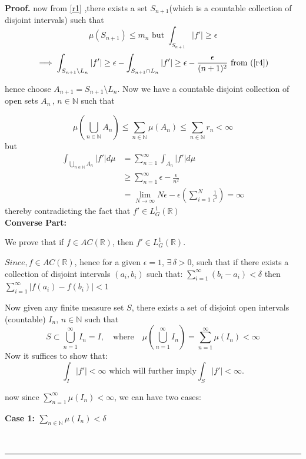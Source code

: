 \documentclass{article}
\numberwithin{equation}{section}
{\theoremstyle{break}\newtheorem{theorem}{Theorem}[subsection]}
{\theoremstyle{break}\theorembodyfont{\rmfamily}\newtheorem{example}[theorem]{Example}}
{\theoremstyle{break}\theorembodyfont{\rmfamily}\newtheorem{definition}[theorem]{Definition}}
{\theoremstyle{break}\theorembodyfont{\rmfamily}\newtheorem{notation}[theorem]{Notation}}
{\theoremstyle{break}\theorembodyfont{\rmfamily}\newtheorem{remark}[theorem]{Remark}}
\newenvironment{proof}[1][Proof]{\noindent\textbf{#1.} }{\
\rule{0.5em}{0.5em}}
\begin{document}
{{\begin{proof}
now from \ref{r1} ,there exists a set $S_{n+1}$(which is a countable collection of disjoint intervals)
such that 
\[\mu(S_{n+1})  \leq m_n \text{  but  } \int_{S_{n+1}} \left|f'\right|\geq\epsilon
\]
\[
\implies \int_{S_{n+1}\setminus L_n} \left|f'\right|\geq\epsilon - \int_{S_{n+1}\cap L_n} \left|f'\right|\geq\epsilon - \frac{\epsilon}{(n+1)^2} \text{    from (\ref{r4})}
\]

hence choose $A_{n+1} = S_{n+1} \setminus L_n$.
Now  we have a countable disjoint collection of open sets $A_n \,,\, n\in \mathbb{N} $ such that 

\[
\mu\left(\bigcup_{n\in \mathbb{N}} A_n \right)\leq
\sum_{n\in \mathbb{N}}\mu(A_n) \leq
\sum_{n\in \mathbb{N}}r_n <\infty
\]
but 
\begin{align*}\displaystyle
    \int_{\bigcup_{n\in \mathbb{N}} A_n } \left|f'\right|d\mu&= \sum_{n = 1}^\infty \int_{ A_n } \left|f'\right|d\mu\\
    &\geq \sum_{n = 1}^\infty \epsilon- \frac{\epsilon}{n^2}\\
    &=\lim_{N\to \infty}N\epsilon - \epsilon\left(\sum_{i = 1}^N \frac{1}{i^2}\right) = \infty
\end{align*}
thereby contradicting the fact that $f' \in L^1_G(\mathbb{R})$\\


\textbf{Converse Part:}

We prove that if $f \in AC(\mathbb{R})$, then $f' \in L^1_G(\mathbb{R})$.  

$Since, f \in AC(\mathbb{R})$, hence for a given $\epsilon = 1$, $\exists \, \delta > 0$, such that if there exists a collection of disjoint intervals $(a_i, b_i)$ such that:
$\sum_{i=1}^\infty (b_i - a_i) < \delta$
then$\sum_{i=1}^\infty \left| f(a_i)-f(b_i)\right| < 1$

Now given any finite measure set $S$, there exists a set of disjoint open intervals (countable) $I_n, \, n \in \mathbb{N}$ such that
\[
S \subset \bigcup_{n=1}^\infty I_n=I, \quad \text{where} \quad \mu\left(\bigcup_{n=1}^\infty I_n\right) = \sum_{n=1}^\infty \mu(I_n) < \infty
\]
Now it suffices to show that:
\[
\int_I |f'| < \infty \text{  which will further imply}  \int_S|f'| < \infty.
\]

now since $\sum_{n=1}^\infty \mu(I_n) < \infty$,
we can have two cases:

\textbf{Case 1: $\sum_{n \in \mathbb{N}} \mu(I_n) < \delta$}


\end{proof}}}
\end{document}
